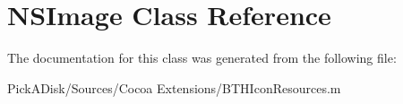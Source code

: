 \hypertarget{class_n_s_image}{
\section{NSImage Class Reference}
\label{class_n_s_image}
}


The documentation for this class was generated from the following file:\begin{DoxyCompactItemize}
\item 
PickADisk/Sources/Cocoa Extensions/BTHIconResources.m\end{DoxyCompactItemize}

